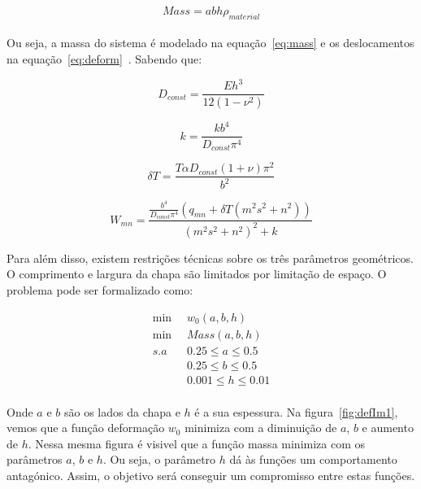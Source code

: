 \documentclass[a4paper,12pt]{article}
\begin{document}
\begin{equation}\label{eq:mass}
Mass = a b h \rho_{material}
\end{equation}
\\

Ou seja, a massa do sistema é modelado na equação~\ref{eq:mass} e os deslocamentos na equação~\ref{eq:deform}~\cite{eqDeform}. 
Sabendo que:

\begin{equation}\label{eq:fo}
D_{const}=\frac{E h^3}{12\left(1-{\nu}^2\right)}
\end{equation}

\begin{equation}\label{eq:fo}
k=\frac{k b^4}{D_{const} {\pi}^4}
\end{equation}

\begin{equation}\label{eq:fo}
\delta T=\frac{T \alpha D_{const} \left(1+\nu\right) {\pi}^2}{b^2}
\end{equation}

\begin{equation}\label{eq:fo}
W_{mn}=\frac{\frac{b^4}{D_{const} {\pi}^4} \left(q_{mn}+\delta T \left(m^2 s^2+n^2\right)\right)}{{\left(m^2 s^2+n^2\right)}^2+k}
\end{equation}


Para além disso, existem restrições técnicas sobre os três parâmetros geométricos. O comprimento e largura da chapa são limitados por limitação de espaço. O problema pode ser formalizado como:

\begin{equation}\label{eq:prob}
\begin{split}
\min\;\; &w_{0}(a, b, h)\\
\min\;\; &Mass(a, b, h)\\
s.a\;\; & 0.25\leq a\leq 0.5\\
& 0.25\leq b\leq 0.5\\
& 0.001\leq h\leq 0.01\\
\end{split}
\end{equation}

Onde $a$ e $b$ são os lados da chapa e $h$ é a sua espessura. Na figura~\ref{fig:defIm1}, vemos que a função deformação $w_{0}$ minimiza com a diminuição de $a$, $b$ e aumento de $h$. Nessa mesma figura é visivel que a função massa minimiza com os parâmetros $a$, $b$ e $h$. Ou seja, o parâmetro $h$ dá às funções um comportamento antagónico. Assim, o objetivo será conseguir um compromisso entre estas funções.
\end{document}
